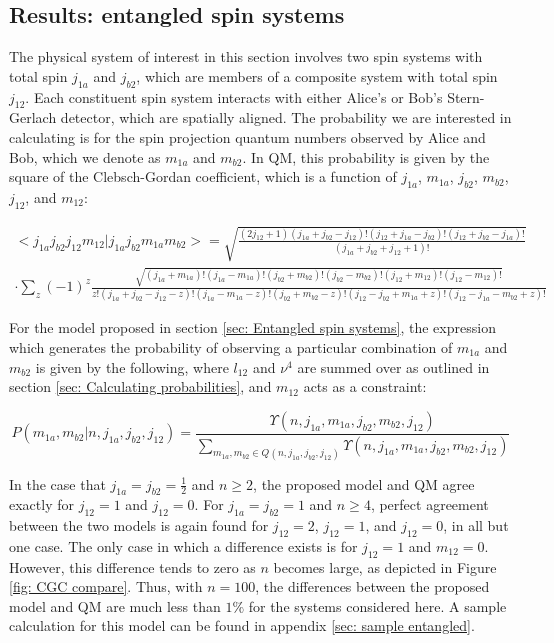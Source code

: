 \documentclass{article}
\begin{document}
\subsection{Results: entangled spin systems  \label{sec: entangled results}}

The physical system of interest in this section involves two spin systems with total spin $j_{1a}$ and $j_{b2}$, which are members of a composite system with total spin $j_{12}$. Each constituent spin system interacts with either Alice's or Bob's Stern-Gerlach detector, which are spatially aligned. The probability we are interested in calculating is for the spin projection quantum numbers observed by Alice and Bob, which we denote as $m_{1a}$ and $m_{b2}$. In QM, this probability is given by the square of the Clebsch-Gordan coefficient, which is a function of $j_{1a}$, $m_{1a}$, $j_{b2}$, $m_{b2}$, $j_{12}$, and $m_{12}$:

\begin{equation}
\begin{array}{cc}
  <j_{1a}j_{b2}j_{12}m_{12}|j_{1a}j_{b2}m_{1a}m_{b2}>=\sqrt{\frac{(2j_{12}+1)(j_{1a}+j_{b2}-j_{12})!(j_{12}+j_{1a}-j_{b2})!(j_{12}+j_{b2}-j_{1a})!}{(j_{1a}+j_{b2}+j_{12}+1)!}}\\
\cdot\sum_{z}(-1)^{z}\frac{\sqrt{(j_{1a}+m_{1a})!(j_{1a}-m_{1a})!(j_{b2}+m_{b2})!(j_{b2}-m_{b2})!(j_{12}+m_{12})!(j_{12}-m_{12})!}}{z!(j_{1a}+j_{b2}-j_{12}-z)!(j_{1a}-m_{1a}-z)!(j_{b2}+m_{b2}-z)!(j_{12}-j_{b2}+m_{1a}+z)!(j_{12}-j_{1a}-m_{b2}+z)!}
\end{array}
  \label{eq: Original CGs}
\end{equation}

For the model proposed in section \ref{sec: Entangled spin systems}, the expression which generates the probability of observing a particular combination of $m_{1a}$ and $m_{b2}$ is given by the following, where $l_{12}$ and $\nu^4$ are summed over as outlined in section \ref{sec: Calculating probabilities}, and $m_{12}$ acts as a constraint:

\begin{equation}
    P(m_{1a},m_{b2}|n,j_{1a},j_{b2},j_{12})=\frac{\Upsilon(n,j_{1a},m_{1a},j_{b2},m_{b2},j_{12})}{\sum_{m_{1a},m_{b2}\in Q(n,j_{1a},j_{b2},j_{12})}\Upsilon(n,j_{1a},m_{1a},j_{b2},m_{b2},j_{12})}
    \label{eq: Probability for entangled}
\end{equation}

In the case that $j_{1a}=j_{b2}=\frac{1}{2}$ and $n\geq 2$, the proposed model and QM agree exactly for $j_{12}=1$ and $j_{12}=0$. For $j_{1a}=j_{b2}=1$ and $n\geq 4$, perfect agreement between the two models is again found for $j_{12}=2$, $j_{12}=1$, and $j_{12}=0$, in all but one case. The only case in which a difference exists is for $j_{12}=1$ and $m_{12}=0$. However, this difference tends to zero as $n$ becomes large, as depicted in Figure \ref{fig: CGC compare}. Thus, with $n=100$, the differences between the proposed model and QM are much less than $1\%$ for the systems considered here. A sample calculation for this model can be found in appendix \ref{sec: sample entangled}.
\end{document}
